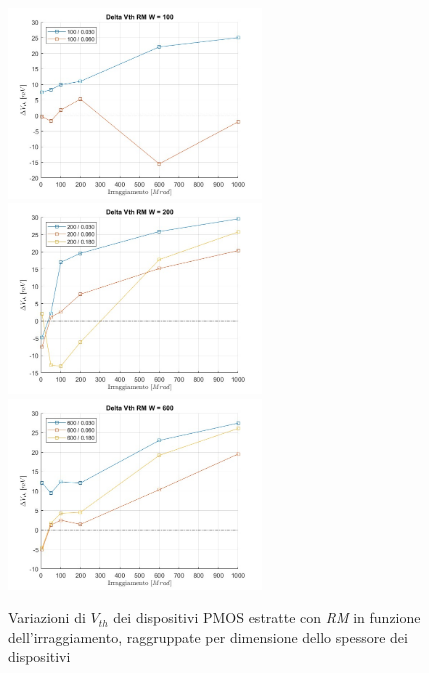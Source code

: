 \documentclass[12pt, letterpaper]{book}
\begin{document}
\begin{figure}[H]
  \centering
  \includegraphics[width=0.6\textwidth]{sovrapposizione-deltaVth-RM-P100}
  \includegraphics[width=0.6\textwidth]{sovrapposizione-deltaVth-RM-P200}
  \includegraphics[width=0.6\textwidth]{sovrapposizione-deltaVth-RM-P600}
  \caption{Variazioni di $V_{th}$ dei dispositivi PMOS estratte con \emph{RM} in funzione dell'irraggiamento, raggruppate per dimensione dello spessore dei dispositivi}
\end{figure}
\end{document}
